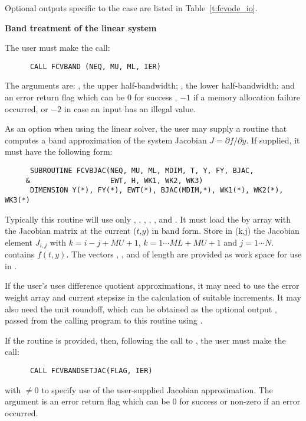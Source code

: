 \begin{Steps}
  Optional outputs specific to the {\dense} case are listed in Table~\ref{t:fcvode_io}.

  {\s} {\bf Band treatment of the linear system}
  
  The user must make the call:
\begin{verbatim}
      CALL FCVBAND (NEQ, MU, ML, IER)
\end{verbatim}
  The arguments are: , the upper half-bandwidth; , 
  the lower half-bandwidth; and  an error return flag which can be  
  $0$ for success , $-1$ if a memory allocation failure occurred, or $-2$ 
  in case an input has an illegal value.     
  
  As an option when using the {\band} linear solver, the user may supply a
  routine that computes a band approximation of the system Jacobian 
  $J = \partial f / \partial y$. If supplied, it must have the following form:
\begin{verbatim}
      SUBROUTINE FCVBJAC(NEQ, MU, ML, MDIM, T, Y, FY, BJAC,
     &                   EWT, H, WK1, WK2, WK3)
      DIMENSION Y(*), FY(*), EWT(*), BJAC(MDIM,*), WK1(*), WK2(*), WK3(*)
\end{verbatim}
  Typically this routine will use only , , , , 
  , and . 
  It must load the  by  array  with the Jacobian matrix
  at the current ($t$,$y$) in band form.  Store in (k,j) the Jacobian
  element $J_{i,j}$ with $k = i - j + MU + 1$, $k = 1 \cdots ML+MU+1$ and
  $j = 1 \cdots N$.  contains $f(t,y)$. The vectors , ,
  and  of length  are provided as work space for use in
  .

  If the user's  uses difference quotient approximations, it
  may need to use the error weight array  and current stepsize 
  in the calculation of suitable increments.  It may also need the unit
  roundoff, which can be obtained as the optional output ,
  passed from the calling program to this routine using .

  If the  routine is provided, then, following the call to ,
  the user must make the call:
\begin{verbatim}
      CALL FCVBANDSETJAC(FLAG, IER)
\end{verbatim}
  with $\neq 0$ to specify use of the user-supplied Jacobian approximation.
  The argument  is an error return flag which can be $0$ 
  for success or non-zero if an error occurred.
  

\end{Steps}
